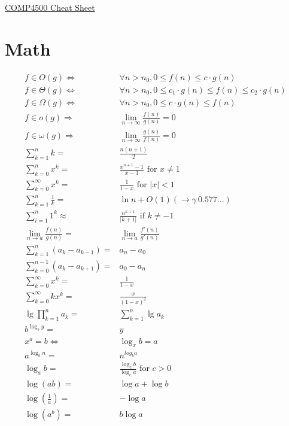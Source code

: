 \documentclass[landscape]{cheat}
\begin{document}
\footnotesize
\begin{multicols*}{3}

\begin{center}
\Large{\underline{COMP4500 Cheat Sheet}} \\
\end{center}

\section{Math}

\begin{align*}
    f \in O(g) \Leftrightarrow& \forall n > n_0, 0 \leq f(n) \leq c \cdot g(n) \\
    f \in \Theta(g) \Leftrightarrow& \forall n > n_0, 0 \leq c_1 \cdot g(n) \leq f(n) \leq c_2 \cdot g(n) \\
    f \in \Omega(g) \Leftrightarrow& \forall n > n_0, 0 \leq c \cdot g(n) \leq f(n) \\
    f \in o(g) \Rightarrow& \lim_{n \rightarrow \infty} \frac {f(n)} {g(n)} = 0 \\
    f \in \omega(g) \Rightarrow& \lim_{n \rightarrow \infty} \frac {g(n)} {f(n)} = 0 \\
    \sum_{k=1}^{n} k =& \frac{n(n + 1)}{2}\\
    \sum_{k=0}^{n} x^k =& \frac{x^{n+1} - 1}{x - 1} \text{ for } x \neq 1\\
    \sum_{k=0}^{\infty} x^k =& \frac{1}{1 - x} \text{ for } |x| < 1\\
    \sum_{k=1}^{n} \frac{1}{k} =& \ln n + O(1) (\rightarrow \gamma ~ 0.577 \ldots)\\
    \sum_{i=1}^{n} 1^k \approx& \frac{n^{k +1}}{|k + 1|} \text{ if } k \neq -1\\
    \lim_{n \rightarrow a} \frac{f(n)}{g(n)} =& \lim_{n \rightarrow a} \frac{f'(n)}{g'(n)}\\
    \sum_{k=1}^{n} (a_k - a_{k - 1}) =& a_n - a_0\\
    \sum_{k=0}^{n-1} (a_k- a_{k + 1}) =& a_0 - a_n\\
    \sum_{k=0}^{\infty} x^k =& \frac{1}{1 - x}\\
    \sum_{k=0}^{\infty} kx^k =& \frac{x}{(1 - x)^2}\\
    \lg \prod_{k = 1}^{n} a_k =& \sum_{k = 1}^{n} \lg a_k\\
    b^{\log_b y} =& y\\
    x^a = b \Leftrightarrow & \log_x b = a\\
    a^{\log_b n} =& n^{log_b a}\\
    \log_a b =& \frac{\log_c b}{\log_c a} \text{ for } c > 0\\
    \log(ab) =& \log a + \log b\\
    \log(\frac{1}{a}) =& -\log a\\
    \log(a^b) =& b \log a
\end{align*}


\end{multicols*}
\end{document}
